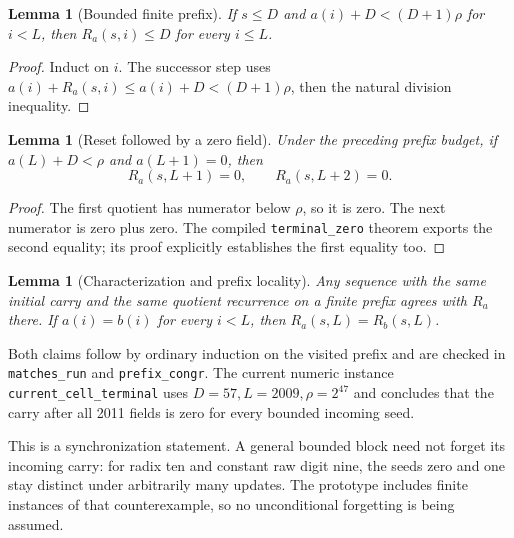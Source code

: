 \documentclass[11pt]{article}
\newcommand{\code}[1]{\nolinkurl{#1}}
\newtheorem{lemma}[proposition]{Lemma}
\begin{document}
\begin{lemma}[Bounded finite prefix]
If \(s\le D\) and
\(a(i)+D<(D+1)\rho\) for \(i<L\), then
\(R_a(s,i)\le D\) for every \(i\le L\).
\end{lemma}
\begin{proof}
Induct on \(i\). The successor step uses
\(a(i)+R_a(s,i)\le a(i)+D<(D+1)\rho\), then the natural division inequality.
\end{proof}

\begin{lemma}[Reset followed by a zero field]
Under the preceding prefix budget, if
\(a(L)+D<\rho\) and \(a(L+1)=0\), then
\[
 R_a(s,L+1)=0,\qquad R_a(s,L+2)=0.
\]
\end{lemma}
\begin{proof}
The first quotient has numerator below \(\rho\), so it is zero. The next
numerator is zero plus zero. The compiled \code{terminal_zero} theorem exports
the second equality; its proof explicitly establishes the first equality too.
\end{proof}

\begin{lemma}[Characterization and prefix locality]
Any sequence with the same initial carry and the same quotient recurrence on a
finite prefix agrees with \(R_a\) there. If \(a(i)=b(i)\) for every \(i<L\),
then \(R_a(s,L)=R_b(s,L)\).
\end{lemma}
Both claims follow by ordinary induction on the visited prefix and are checked
in \code{matches_run} and \code{prefix_congr}. The current numeric instance
\code{current_cell_terminal} uses \(D=57,L=2009,\rho=2^{47}\) and concludes
that the carry after all 2011 fields is zero for every bounded incoming seed.

This is a synchronization statement. A general bounded block need not forget
its incoming carry: for radix ten and constant raw digit nine, the seeds zero
and one stay distinct under arbitrarily many updates. The prototype includes
finite instances of that counterexample, so no unconditional forgetting is
being assumed.
\end{document}
